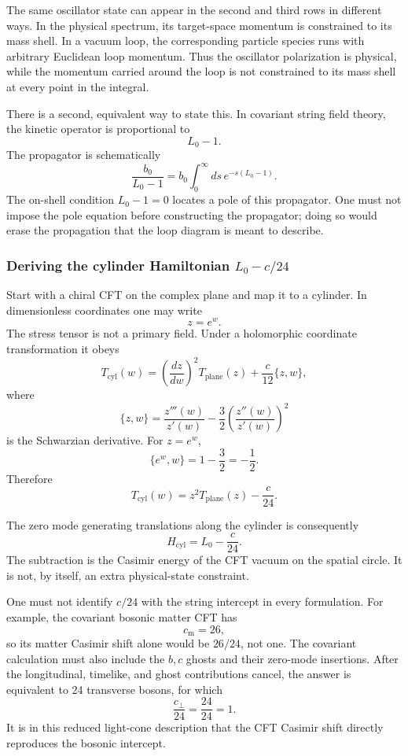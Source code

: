 \documentclass[
  10pt,
  a4paper,
  openany]{book}
\begin{document}
The same oscillator state can appear in the second and third rows in
different ways. In the physical spectrum, its target-space momentum is
constrained to its mass shell. In a vacuum loop, the corresponding
particle species runs with arbitrary Euclidean loop momentum. Thus the
oscillator polarization is physical, while the momentum carried around
the loop is not constrained to its mass shell at every point in the
integral.

There is a second, equivalent way to state this. In covariant string
field theory, the kinetic operator is proportional to \[
L_0-1.
\] The propagator is schematically \[
\frac{b_0}{L_0-1}
=
b_0\int_0^\infty ds\,
e^{-s(L_0-1)}.
\] The on-shell condition \(L_0-1=0\) locates a pole of this propagator.
One must not impose the pole equation before constructing the
propagator; doing so would erase the propagation that the loop diagram
is meant to describe.

\subsubsection{\texorpdfstring{Deriving the cylinder Hamiltonian
\(L_0-c/24\)}{Deriving the cylinder Hamiltonian L\_0-c/24}}\label{deriving-the-cylinder-hamiltonian-l_0-c24}

Start with a chiral CFT on the complex plane and map it to a cylinder.
In dimensionless coordinates one may write \[
z=e^w.
\] The stress tensor is not a primary field. Under a holomorphic
coordinate transformation it obeys \[
T_{\mathrm{cyl}}(w)
=
\left(\frac{dz}{dw}\right)^2T_{\mathrm{plane}}(z)
+\frac{c}{12}\{z,w\},
\] where \[
\{z,w\}
=
\frac{z'''(w)}{z'(w)}
-\frac32
\left(\frac{z''(w)}{z'(w)}\right)^2
\] is the Schwarzian derivative. For \(z=e^w\), \[
\{e^w,w\}
=1-\frac32
=-\frac12.
\] Therefore \[
T_{\mathrm{cyl}}(w)
=z^2T_{\mathrm{plane}}(z)-\frac{c}{24}.
\]

The zero mode generating translations along the cylinder is consequently
\[
\boxed{
H_{\mathrm{cyl}}
=L_0-\frac{c}{24}.
}
\] The subtraction is the Casimir energy of the CFT vacuum on the
spatial circle. It is not, by itself, an extra physical-state
constraint.

One must not identify \(c/24\) with the string intercept in every
formulation. For example, the covariant bosonic matter CFT has \[
c_{\mathrm m}=26,
\] so its matter Casimir shift alone would be \(26/24\), not one. The
covariant calculation must also include the \(b,c\) ghosts and their
zero-mode insertions. After the longitudinal, timelike, and ghost
contributions cancel, the answer is equivalent to 24 transverse bosons,
for which \[
\frac{c_\perp}{24}
=
\frac{24}{24}
=1.
\] It is in this reduced light-cone description that the CFT Casimir
shift directly reproduces the bosonic intercept.
\end{document}
